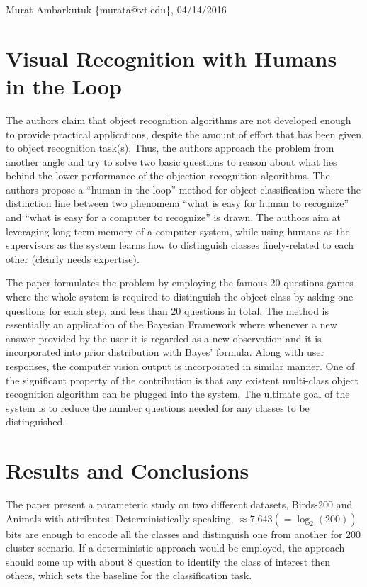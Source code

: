 \documentclass[11pt]{article}
\begin{document}
\thispagestyle{empty}
\begin{flushright}
	\small{Murat Ambarkutuk \{murata@vt.edu\}, 04/14/2016}
\end{flushright}
\section*{Visual Recognition with Humans in the Loop}
The authors claim that object recognition algorithms are not developed enough to provide practical applications, despite the amount of effort that has been given to object recognition task(s).
Thus, the authors approach the problem from another angle and try to solve two basic questions to reason about what lies behind the lower performance of the objection recognition algorithms.
The authors propose a ``human-in-the-loop'' method for object classification where the distinction line between two phenomena ``what is easy for human to recognize'' and ``what is easy for a computer to recognize'' is drawn.
The authors aim at leveraging long-term memory of a computer system, while using humans as the supervisors as the system learns how to distinguish classes finely-related to each other (clearly needs expertise).

The paper formulates the problem by employing the famous 20 questions games where the whole system is required to distinguish the object class by asking one questions for each step, and less than 20 questions in total.
The method is essentially an application of the Bayesian Framework where whenever a new answer provided by the user it is regarded as a new observation and it is incorporated into prior distribution with Bayes' formula.
Along with user responses, the computer vision output is incorporated in similar manner.
One of the significant property of the contribution is that any existent multi-class object recognition algorithm can be plugged into the system.
The ultimate goal of the system is to reduce the number questions needed for any classes to be distinguished.

\section*{Results and Conclusions}
The paper present a parameteric study on two different datasets, Birds-200 and Animals with attributes.
Deterministically speaking, $\approx 7.643 (=\log_2(200))$ bits are enough to encode all the classes and distinguish one from another for 200 cluster scenario.
If a deterministic approach would be employed, the approach should come up with about 8 question to identify the class of interest then others, which sets the baseline for the classification task. %
\end{document}
